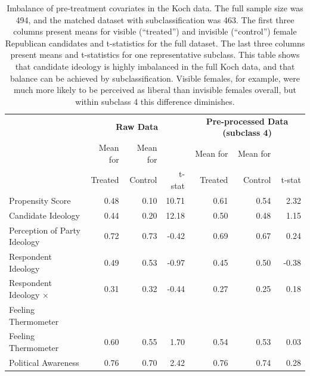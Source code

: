 \documentclass[11pt,letterpaper]{article}
\theoremstyle{plain}
\newcommand{\MC}{\multicolumn}
\begin{document}
\begin{table}[t]
  \begin{center}
    \begin{tabular}{lrrrrrr}
      \hline
      & \MC{3}{c}{\bf Raw Data} & \MC{3}{c}{\bf Pre-processed Data
      (subclass 4) }\\
      & Mean for  & Mean for  &    & Mean for  & Mean for \\
      & Treated & Control  & t-stat &    Treated & Control  & t-stat \\
      \hline
      Propensity Score & 0.48 & 0.10 & 10.71 & 0.61 & 0.54 & 2.32 \\
      Candidate Ideology & 0.44 & 0.20 & 12.18 & 0.50 & 0.48 & 1.15 \\
      Perception of Party Ideology & 0.72 & 0.73 & -0.42 & 0.69 & 0.67 & 0.24 \\
      Respondent Ideology & 0.49 & 0.53 & -0.97 & 0.45 & 0.50 & -0.38 \\
      \hspace{0.1in} Respondent Ideology $\times$ & 0.31 & 0.32 & -0.44 & 0.27 &
      0.25 & 0.18 \\
      Feeling Thermometer\\
      Feeling Thermometer & 0.60 & 0.55 & 1.70 & 0.54 & 0.53 & 0.03 \\
      Political Awareness & 0.76 & 0.70 & 2.42 & 0.76 & 0.74 & 0.28 \\
      \hline
    \end{tabular}
    \caption{Imbalance of pre-treatment covariates in the Koch data.
      The full sample size was 494, and the matched dataset with
      subclassification was 463.  The first three columns present
      means for visible (``treated'') and invisible (``control'')
      female Republican candidates and t-statistics for the full
      dataset.  The last three columns present means and t-statistics
      for one representative subclass.  This table shows that
      candidate ideology is highly imbalanced in the full Koch data,
      and that balance can be achieved by subclassification.  Visible
      females, for example, were much more likely to be perceived as
      liberal than invisible females overall, but within subclass 4
      this difference diminishes.}
    \label{tb:kochmtest}
  \end{center}
\end{table}
\end{document}
